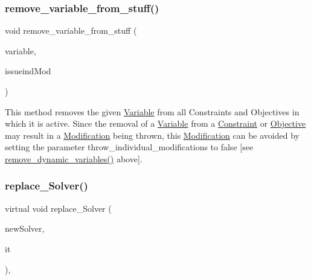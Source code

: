 \subsubsection{\texorpdfstring{remove\+\_\+variable\+\_\+from\+\_\+stuff()}{remove\_variable\_from\_stuff()}}
{\footnotesize\ttfamily void remove\+\_\+variable\+\_\+from\+\_\+stuff (\begin{DoxyParamCaption}\item[{\mbox{\hyperlink{class_s_m_spp__di__unipi__it_1_1_variable}{Variable}} $\ast$const}]{variable,  }\item[{const int}]{issueind\+Mod }\end{DoxyParamCaption})\hspace{0.3cm}{\ttfamily [private]}}

This method removes the given \mbox{\hyperlink{class_s_m_spp__di__unipi__it_1_1_variable}{Variable}} from all Constraints and Objectives in which it is active. Since the removal of a \mbox{\hyperlink{class_s_m_spp__di__unipi__it_1_1_variable}{Variable}} from a \mbox{\hyperlink{class_s_m_spp__di__unipi__it_1_1_constraint}{Constraint}} or \mbox{\hyperlink{class_s_m_spp__di__unipi__it_1_1_objective}{Objective}} may result in a \mbox{\hyperlink{class_s_m_spp__di__unipi__it_1_1_modification}{Modification}} being thrown, this \mbox{\hyperlink{class_s_m_spp__di__unipi__it_1_1_modification}{Modification}} can be avoided by setting the parameter throw\+\_\+individual\+\_\+modifications to false \mbox{[}see \mbox{\hyperlink{class_s_m_spp__di__unipi__it_1_1_block_a1c7a7f0599403293cdb7cecd381329e3}{remove\+\_\+dynamic\+\_\+variables()}} above\mbox{]}. \mbox{\label{class_s_m_spp__di__unipi__it_1_1_block_ae7306554741d39d82838487ae623daed}} 
\subsubsection{\texorpdfstring{replace\+\_\+\+Solver()}{replace\_Solver()}}
{\footnotesize\ttfamily virtual void replace\+\_\+\+Solver (\begin{DoxyParamCaption}\item[{\mbox{\hyperlink{class_s_m_spp__di__unipi__it_1_1_solver}{Solver}} $\ast$}]{new\+Solver,  }\item[{\mbox{\hyperlink{namespace_s_m_spp__di__unipi__it_a8d60e91b37db595a92964f6f4a52bf17}{c\+\_\+\+Lst\+\_\+\+Solver\+\_\+it}}}]{it }\end{DoxyParamCaption})\hspace{0.3cm}{\ttfamily [inline]}, {\ttfamily [virtual]}}



